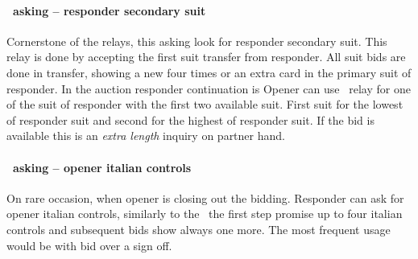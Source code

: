 \paragraph{\lambdaRelay\ asking – responder secondary suit}
Cornerstone of the relays, this asking look for responder secondary suit. This relay is done by accepting the first suit transfer from responder. All suit bids are done in transfer, showing a new four times or an extra card in the primary suit of responder.
In the auction
responder continuation is
Opener can use \gammaRelay\ relay for one of the suit of responder with the first two available suit. First suit for the lowest of responder suit and second for the highest of responder suit. If the \bid{2\NT} bid is available this is an \emph{extra length} inquiry on partner hand.
\paragraph{\omegaRelay\ asking – opener italian controls}
On rare occasion, when opener is closing out the bidding. Responder can ask for opener italian controls, similarly to the \betaRelay\ the first step promise up to four italian controls and subsequent bids show always one more. The most frequent usage would be with \bid{4\CS} bid over a \bid{3\NT} sign off.
